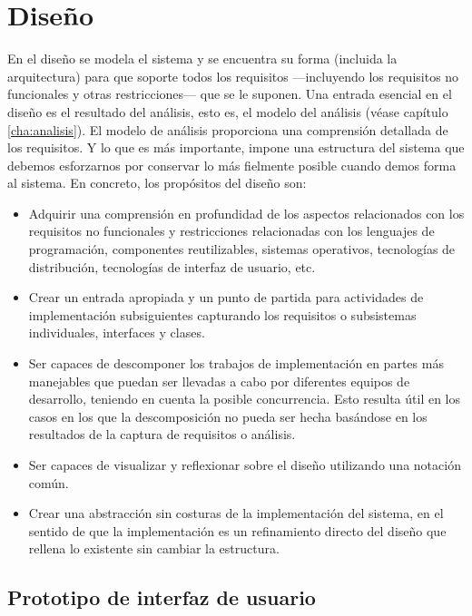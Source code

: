 \chapter{Diseño} %
	\label{cha:diseno}
	
	En el diseño se modela el sistema y se encuentra su forma (incluida la arquitectura) para que soporte todos los requisitos ---incluyendo los requisitos no funcionales y otras restricciones--- que se le suponen. Una entrada esencial en el diseño es el resultado del análisis, esto es, el modelo del análisis (véase capítulo \ref{cha:analisis}). El modelo de análisis proporciona una comprensión detallada de los requisitos. Y lo que es más importante, impone una estructura del sistema que debemos esforzarnos por conservar lo más fielmente posible cuando demos forma al sistema. En concreto, los propósitos del diseño son:
	\begin{itemize}
		\item Adquirir una comprensión en profundidad de los aspectos relacionados con los requisitos no funcionales y restricciones relacionadas con los lenguajes de programación, componentes reutilizables, sistemas operativos, tecnologías de distribución, tecnologías de interfaz de usuario, etc.
		\item Crear un entrada apropiada y un punto de partida para actividades de implementación subsiguientes capturando los requisitos o subsistemas individuales, interfaces y clases.
		\item Ser capaces de descomponer los trabajos de implementación en partes más manejables que puedan ser llevadas a cabo por diferentes equipos de desarrollo, teniendo en cuenta la posible concurrencia. Esto resulta útil en los casos en los que la descomposición no pueda ser hecha basándose en los resultados de la captura de requisitos o análisis. 
		\item Ser capaces de visualizar y reflexionar sobre el diseño utilizando una notación común.
		\item Crear una abstracción sin costuras de la implementación del sistema, en el sentido de que la implementación es un refinamiento directo del diseño que rellena lo existente sin cambiar la estructura. 
	\end{itemize}
	
  \section{Prototipo de interfaz de usuario} %
  	\label{sec:prototipo_de_interfaz_de_usuario}

